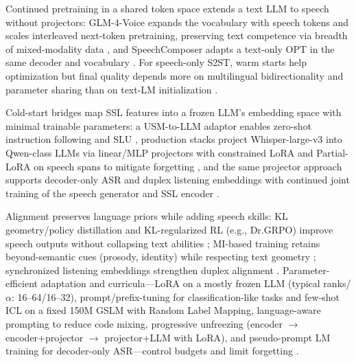 \documentclass{article}
\begin{document}
Continued pretraining in a shared token space extends a text LLM to speech without projectors: GLM-4-Voice expands the vocabulary with speech tokens and scales interleaved next-token pretraining, preserving text competence via breadth of mixed-modality data \cite{zeng2024scalingspeechtextpretrainingsyntheticint}, and SpeechComposer adapts a text-only OPT in the same decoder and vocabulary \cite{wu2024speechcomposerunifyingmultiplespeechtask}. For speech-only S2ST, warm starts help optimization but final quality depends more on multilingual bidirectionality and parameter sharing than on text-LM initialization \cite{peng2024mslms2stmultitaskspeechlanguagemodeltext}.

Cold-start bridges map SSL features into a frozen LLM's embedding space with minimal trainable parameters: a USM-to-LLM adaptor enables zero-shot instruction following and SLU \cite{wang2023slmbridgethingapbetweenspeechtextfoundat}, production stacks project Whisper-large-v3 into Qwen-class LLMs via linear/MLP projectors with constrained LoRA and Partial-LoRA on speech spans to mitigate forgetting \cite{wang2024blspemotowardsempatheticlargespeechlangu}, and the same projector approach supports decoder-only ASR and duplex listening embeddings with continued joint training of the speech generator and SSL encoder \cite{tsunoo2024decoderonlyarchitecturespeechrecognition,ma2024languagemodelcanlistenwhilespeaking}.

Alignment preserves language priors while adding speech skills: KL geometry/policy distillation and KL-regularized RL (e.g., Dr.GRPO) improve speech outputs without collapsing text abilities \cite{wang2024blspemotowardsempatheticlargespeechlangu,li2025seewossubmissionmlcslmlessonslearnedspee}; MI-based training retains beyond-semantic cues (prosody, identity) while respecting text geometry \cite{wang2025bossbeyondsemanticspeech}; synchronized listening embeddings strengthen duplex alignment \cite{ma2024languagemodelcanlistenwhilespeaking}. Parameter-efficient adaptation and curricula---LoRA on a mostly frozen LLM (typical ranks/$\alpha$: 16--64/16--32), prompt/prefix-tuning for classification-like tasks and few-shot ICL on a fixed 150M GSLM with Random Label Mapping, language-aware prompting to reduce code mixing, progressive unfreezing (encoder $\rightarrow$ encoder+projector $\rightarrow$ projector+LLM with LoRA), and pseudo-prompt LM training for decoder-only ASR---control budgets and limit forgetting \cite{hsu2024exploringcontextlearningtextlessspeechla,li2025seewossubmissionmlcslmlessonslearnedspee,nguyen2025qwenvsgemmaintegrationwhispercomparative,tsunoo2024decoderonlyarchitecturespeechrecognition}.
\end{document}
